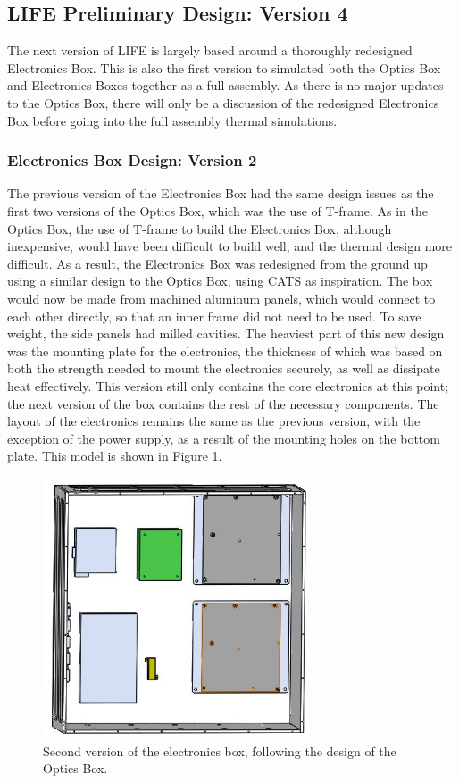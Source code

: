 \subsection{LIFE Preliminary Design: Version 4} 
The next version of LIFE is largely based around a thoroughly redesigned Electronics Box. This is also the first version to simulated both the Optics Box and Electronics Boxes together as a full assembly. As there is no major updates to the Optics Box, there will only be a discussion of the redesigned Electronics Box before going into the full assembly thermal simulations.

\subsubsection{Electronics Box Design: Version 2}
The previous version of the Electronics Box had the same design issues as the first two versions of the Optics Box, which was the use of T-frame. As in the Optics Box, the use of T-frame to build the Electronics Box, although inexpensive, would have been difficult to build well, and the thermal design more difficult. As a result, the Electronics Box was redesigned from the ground up using a similar design to the Optics Box, using CATS as inspiration. The box would now be made from machined aluminum panels, which would connect to each other directly, so that an inner frame did not need to be used. To save weight, the side panels had milled cavities. The heaviest part of this new design was the mounting plate for the electronics, the thickness of which was based on both the strength needed to mount the electronics securely, as well as dissipate heat effectively. This version still only contains the core electronics at this point; the next version of the box contains the rest of the necessary components. The layout of the electronics remains the same as the previous version, with the exception of the power supply, as a result of the mounting holes on the bottom plate. This model is shown in Figure \ref{fig:EBOX_V2}.

\begin{figure}
    \centering
    \includegraphics[width=0.7\textwidth]{chap3_images/LIFE_V4_images/Ebox_V2.JPG}
    \caption{Second version of the electronics box, following the design of the Optics Box.}
    \label{fig:EBOX_V2}
\end{figure}

